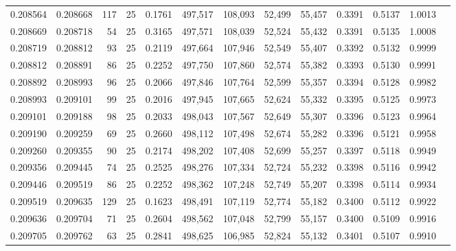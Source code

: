 \begin{tabular}{rrrrrrrrrrrrr}
0.208564 & 0.208668 &   117 &  25 &                                     0.1761 & 497,517 & 108,093 &  52,499 &  55,457 & 0.3391 & 0.5137 & 1.0013 \\
0.208669 & 0.208718 &    54 &  25 &                                     0.3165 & 497,571 & 108,039 &  52,524 &  55,432 & 0.3391 & 0.5135 & 1.0008 \\
0.208719 & 0.208812 &    93 &  25 &                                     0.2119 & 497,664 & 107,946 &  52,549 &  55,407 & 0.3392 & 0.5132 & 0.9999 \\
0.208812 & 0.208891 &    86 &  25 &                                     0.2252 & 497,750 & 107,860 &  52,574 &  55,382 & 0.3393 & 0.5130 & 0.9991 \\
0.208892 & 0.208993 &    96 &  25 &                                     0.2066 & 497,846 & 107,764 &  52,599 &  55,357 & 0.3394 & 0.5128 & 0.9982 \\
0.208993 & 0.209101 &    99 &  25 &                                     0.2016 & 497,945 & 107,665 &  52,624 &  55,332 & 0.3395 & 0.5125 & 0.9973 \\
0.209101 & 0.209188 &    98 &  25 &                                     0.2033 & 498,043 & 107,567 &  52,649 &  55,307 & 0.3396 & 0.5123 & 0.9964 \\
0.209190 & 0.209259 &    69 &  25 &                                     0.2660 & 498,112 & 107,498 &  52,674 &  55,282 & 0.3396 & 0.5121 & 0.9958 \\
0.209260 & 0.209355 &    90 &  25 &                                     0.2174 & 498,202 & 107,408 &  52,699 &  55,257 & 0.3397 & 0.5118 & 0.9949 \\
0.209356 & 0.209445 &    74 &  25 &                                     0.2525 & 498,276 & 107,334 &  52,724 &  55,232 & 0.3398 & 0.5116 & 0.9942 \\
0.209446 & 0.209519 &    86 &  25 &                                     0.2252 & 498,362 & 107,248 &  52,749 &  55,207 & 0.3398 & 0.5114 & 0.9934 \\
0.209519 & 0.209635 &   129 &  25 &                                     0.1623 & 498,491 & 107,119 &  52,774 &  55,182 & 0.3400 & 0.5112 & 0.9922 \\
0.209636 & 0.209704 &    71 &  25 &                                     0.2604 & 498,562 & 107,048 &  52,799 &  55,157 & 0.3400 & 0.5109 & 0.9916 \\
0.209705 & 0.209762 &    63 &  25 &                                     0.2841 & 498,625 & 106,985 &  52,824 &  55,132 & 0.3401 & 0.5107 & 0.9910 \\

\end{tabular}
